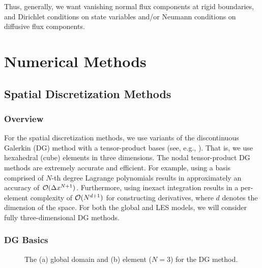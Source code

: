 \documentclass{article}
\begin{document}
Thus, generally, we want vanishing normal flux components at rigid boundaries, and Dirichlet conditions on state variables and/or Neumann conditions on diffusive flux components.

\section{Numerical Methods}
\label{sec:numerical_methods}

\subsection{Spatial Discretization Methods}

\subsubsection{Overview}
For the spatial discretization methods, we use variants of the discontinuous Galerkin (DG) method with a tensor-product bases (see, e.g., \citealt{giraldo:2008a, abdi:2016}). That is, we use hexahedral (cube) elements in three dimensions.  The nodal tensor-product DG methods are extremely accurate and efficient.  For example, using a basis comprised of $N$-th degree Lagrange polynomials results in approximately an accuracy of $\mathcal{O}(\Delta x^{N+1})$. Furthermore, using inexact integration results in a per-element complexity of $\mathcal{O}(N^{d+1})$ for constructing derivatives, where $d$ denotes the dimension of the space. 
For both the global and LES models, we will consider fully three-dimensional DG methods.

\subsubsection{DG Basics}

\begin{figure}[htbp]
\begin{center}
\end{center}
\caption{The (a) global domain and (b) element ($N=3$) for the DG method.}
\label{fig:spatial_discretization/dg_method}
\end{figure}
\end{document}

